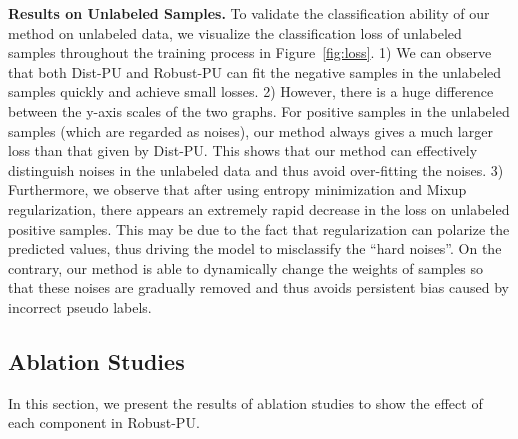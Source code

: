 \documentclass[sigconf]{acmart}
\newcommand{\ourmethod}{Robust-PU\xspace}
\begin{document}
\textbf{Results on Unlabeled Samples.}
To validate the classification ability of our method on unlabeled data, we visualize the classification loss of unlabeled samples throughout the training process in Figure~\ref{fig:loss}. 1) We can observe that both Dist-PU and \ourmethod can fit the negative samples in the unlabeled samples quickly and achieve small losses. 2) However, there is a huge difference between the y-axis scales of the two graphs. For positive samples in the unlabeled samples (which are regarded as noises), our method always gives a much larger loss than that given by Dist-PU. This shows that our method can effectively distinguish noises in the unlabeled data and thus avoid over-fitting the noises. 3) Furthermore, we observe that after using entropy minimization and Mixup regularization, there appears an extremely rapid decrease in the loss on unlabeled positive samples. This may be due to the fact that regularization can polarize the predicted values, thus driving the model to misclassify the ``hard noises''. On the contrary, our method is able to dynamically change the weights of samples so that these noises are gradually removed and thus avoids persistent bias caused by incorrect pseudo labels.

\begin{figure*}[htbp]
\centering
  \subfigure[\ourmethod]{
    \texttt{[image: fig/clpu\_mnist6\_loss.pdf]}
  }
  \vspace{-.5em}
  \caption{Binary cross-entropy loss of (a) Dist-PU and (b) \ourmethod.}
  \label{fig:loss}
\end{figure*}

\subsection{Ablation Studies}
In this section, we present the results of ablation studies to show the effect of each component in \ourmethod.
\end{document}
